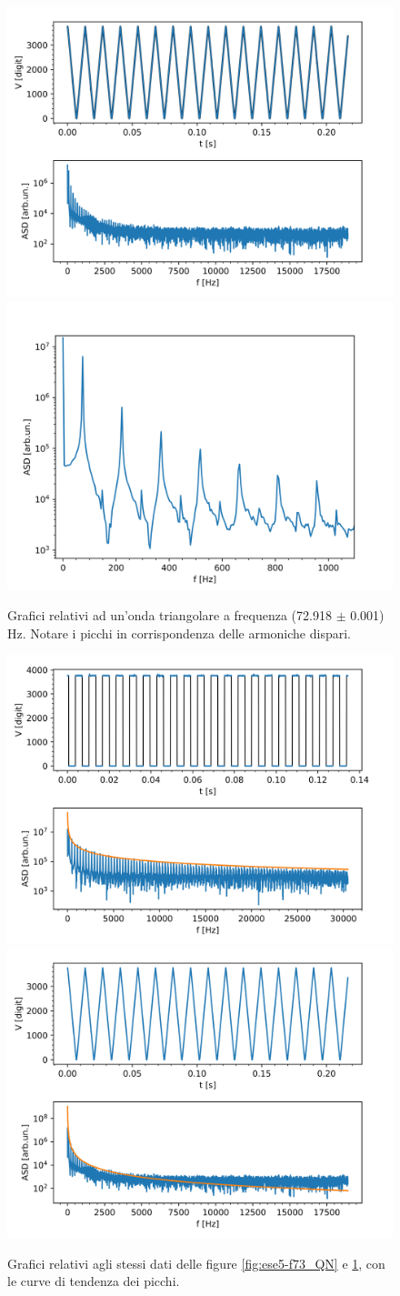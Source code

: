 \documentclass{article}[a4paper, oneside,11pt]
\begin{document}
\begin{figure}[H]
    \centering
    \includegraphics[width=0.45\columnwidth]{img/ese5/f73_TN}
    \includegraphics[width=0.48\columnwidth]{img/ese5/f73_TN-tagl}
    \caption{Grafici relativi ad un'onda triangolare a frequenza (72.918 $\pm$ 0.001) Hz. Notare i picchi in corrispondenza delle armoniche dispari.}
    \label{fig:ese5-f73_TN}
\end{figure}

\begin{figure}[H]
    \centering
    \includegraphics[width=0.45\columnwidth]{img/ese5/f153_QN-retta}
    \includegraphics[width=0.45\columnwidth]{img/ese5/f73_TN-retta}
    \caption{Grafici relativi agli stessi dati delle figure \ref{fig:ese5-f73_QN} e \ref{fig:ese5-f73_TN}, con le curve di tendenza dei picchi.}
    \label{fig:ese5-rette}
\end{figure}
\end{document}
